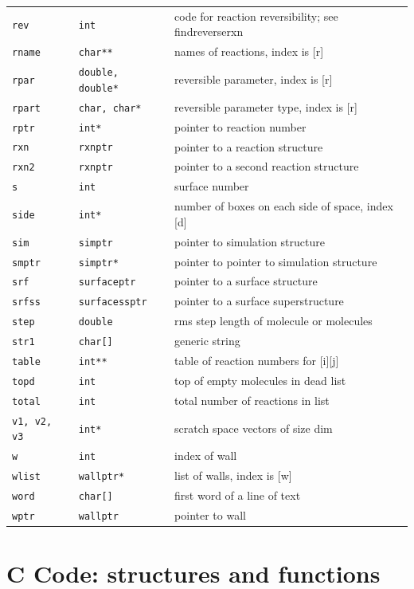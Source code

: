 \documentclass {scrbook}
\newcommand {\ttt} {\texttt}
\begin{document}
\begin{longtable}[c]{lll}
\ttt{rev} & \ttt{int} & code for reaction reversibility; see findreverserxn\\
\ttt{rname} & \ttt{char**} & names of reactions, index is [r]\\
\ttt{rpar} & \ttt{double, double*} & reversible parameter, index is [r]\\
\ttt{rpart} & \ttt{char, char*} & reversible parameter type, index is [r]\\
\ttt{rptr} & \ttt{int*} & pointer to reaction number\\
\ttt{rxn} & \ttt{rxnptr} & pointer to a reaction structure\\
\ttt{rxn2} & \ttt{rxnptr} & pointer to a second reaction structure\\
\ttt{s} & \ttt{int} & surface number\\
\ttt{side} & \ttt{int*} & number of boxes on each side of space, index [d]\\
\ttt{sim} & \ttt{simptr} & pointer to simulation structure\\
\ttt{smptr} & \ttt{simptr*} & pointer to pointer to simulation structure\\
\ttt{srf} & \ttt{surfaceptr} & pointer to a surface structure\\
\ttt{srfss} & \ttt{surfacessptr} & pointer to a surface superstructure\\
\ttt{step} & \ttt{double} & rms step length of molecule or molecules\\
\ttt{str1} & \ttt{char[]} & generic string\\
\ttt{table} & \ttt{int**} & table of reaction numbers for [i][j]\\
\ttt{topd} & \ttt{int} & top of empty molecules in dead list\\
\ttt{total} & \ttt{int} & total number of reactions in list\\
\ttt{v1, v2, v3} & \ttt{int*} & scratch space vectors of size dim\\
\ttt{w} & \ttt{int} & index of wall\\
\ttt{wlist} & \ttt{wallptr*} & list of walls, index is [w]\\
\ttt{word} & \ttt{char[]} & first word of a line of text\\
\ttt{wptr} & \ttt{wallptr} & pointer to wall\\
\end{longtable}

\chapter{C Code: structures and functions}
\end{document}
